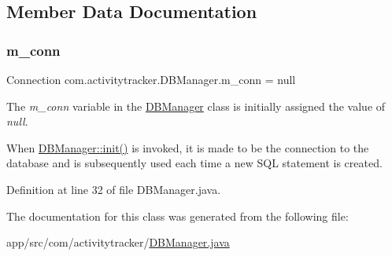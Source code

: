 \subsection{Member Data Documentation}
\mbox{\label{classcom_1_1activitytracker_1_1_d_b_manager_a064088d13ac09eb147fdc19268771521}} 
\subsubsection{\texorpdfstring{m\+\_\+conn}{m\_conn}}
{\footnotesize\ttfamily Connection com.\+activitytracker.\+D\+B\+Manager.\+m\+\_\+conn = null\hspace{0.3cm}{\ttfamily [private]}}

The {\itshape m\+\_\+conn} variable in the \mbox{\hyperlink{classcom_1_1activitytracker_1_1_d_b_manager}{D\+B\+Manager}} class is initially assigned the value of {\itshape null}.

When \mbox{\hyperlink{classcom_1_1activitytracker_1_1_d_b_manager_a41df4600bb5901a26a4ea6a7108a70b9}{D\+B\+Manager\+::init()}} is invoked, it is made to be the connection to the database and is subsequently used each time a new S\+QL statement is created. 

Definition at line 32 of file D\+B\+Manager.\+java.



The documentation for this class was generated from the following file\+:\begin{DoxyCompactItemize}
\item 
app/src/com/activitytracker/\mbox{\hyperlink{_d_b_manager_8java}{D\+B\+Manager.\+java}}\end{DoxyCompactItemize}
